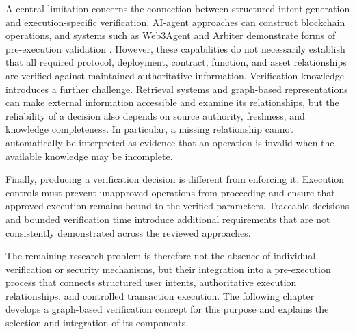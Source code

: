 A central limitation concerns the connection between
structured intent generation and execution-specific
verification. AI-agent approaches can construct blockchain
operations, and systems such as Web3Agent and Arbiter
demonstrate forms of pre-execution validation
\cite{TODO_Web3Agent,TODO_Arbiter2026}.
However, these capabilities do not necessarily establish
that all required protocol, deployment, contract, function,
and asset relationships are verified against maintained
authoritative information. Verification knowledge introduces a further challenge.
Retrieval systems and graph-based representations can make
external information accessible and examine its relationships,
but the reliability of a decision also depends on source
authority, freshness, and knowledge completeness. In
particular, a missing relationship cannot automatically
be interpreted as evidence that an operation is invalid
when the available knowledge may be incomplete.

Finally, producing a verification decision is different
from enforcing it. Execution controls must prevent
unapproved operations from proceeding and ensure that
approved execution remains bound to the verified parameters.
Traceable decisions and bounded verification time introduce
additional requirements that are not consistently
demonstrated across the reviewed approaches.

The remaining research problem is therefore not the absence
of individual verification or security mechanisms, but
their integration into a pre-execution process that connects
structured user intents, authoritative execution relationships,
and controlled transaction execution. The following chapter
develops a graph-based verification concept for this purpose
and explains the selection and integration of its components.





